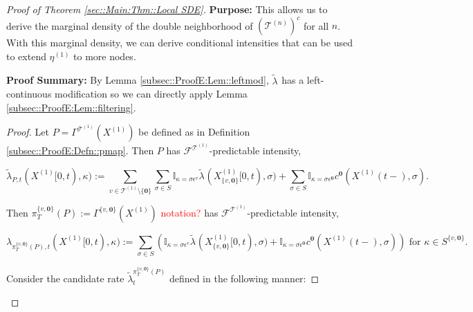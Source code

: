 \documentclass[12pt]{article}
\newcommand{\mb}{\mathbb}
\newcommand{\mc}{\mathcal}
\newcommand{\te}{\text}
\newcommand{\ep}{\epsilon}
\newcommand{\tr}{\textcolor{red}}
\newcommand{\purpose}{\textbf{Purpose: }}
\newcommand{\pfsum}{\textbf{Proof Summary: }}
\newcommand{\defeq}{:=}								%
\renewcommand{\root}{\mathbf{0}}				%
\renewcommand{\v}{v}							%
\renewcommand{\S}{S}							%
\newcommand{\s}{\sigma}							%
\newcommand{\ev}{\ep}							%
\newcommand{\T}{T}								%
\renewcommand{\t}{t}							%
\newcommand{\proj}{\pi}							%
\newcommand{\F}{\mc{F}}							%
\newcommand{\X}{X}								%
\newcommand{\IGr}{c}							%
\newcommand{\vind}[1]{^{#1}}					%
\newcommand{\carp}[1]{^{#1}}					%
\newcommand{\vsi}[1]{^{#1}}						%
\newcommand{\cind}[1]{_{#1}}					%
\newcommand{\tp}[1]{(#1)}						%
\newcommand{\tip}[1]{#1}						%
\newcommand{\ts}[1]{_{#1}}						%
\newcommand{\tree}{\mc{T}}						%
\newcommand{\sln}[1]{^{(#1)}}					%
\newcommand{\rate}{\lambda}						%
\newcommand{\alt}[1]{\widetilde{#1}}			%
\newcommand{\pra}[1]{_{#1}}						%
\newcommand{\mmm}{\eta}							%
\newcommand{\pmap}{\Gamma}						%
\renewcommand{\mark}{\kappa}					%
\newcommand{\rp}{P}								%
\newcommand{\crate}{\alt{\lambda}}				%
\newcommand{\prats}[2]{_{#1,#2}}				%
\begin{document}
\begin{proof}[Proof of Theorem \ref{sec::Main:Thm::Local SDE}]
\purpose This allows us to derive the marginal density of the double neighborhood of \((\tree\sln{n})^c\) for all \(n\). With this marginal density, we can derive conditional intensities that can be used to extend \(\mmm\sln{1}\ts{}\) to more nodes.

\pfsum By Lemma \ref{subsec::ProofE:Lem::leftmod}, \(\crate\vind{}\ts{}\) has a left-continuous modification so we can directly apply Lemma \ref{subsec::ProofE:Lem::filtering}.

\begin{proof}
Let \(\rp = \pmap\vind{\tree\sln{1}}(\X\sln{1}\cind{}\tip{})\) be defined as in Definition \ref{subsec::ProofE:Defn::pmap}. Then \(\rp\) has \(\F\vsi{\tree\sln{1}}\ts{}\)-predictable intensity,

\[\crate\prats{\rp}{\t}(\X\sln{1}\cind{}\tip{[0,\t)},\mark{}) \defeq \sum_{\v\in \tree\sln{1}\setminus\{\root\}}\sum_{\s\in \S} \mb{I}_{\mark{} = \s\ev\vind{\v}}\crate\vind{}\ts{}(\X\sln{1}\cind{\{\v,\root\}}\tip{[0,\t)},\s) + \sum_{\s\in\S}\mb{I}_{\mark{} = \s\ev\vind{\root}}\IGr\vind{\root}(\X\sln{1}\cind{}\tp{\t-},\s).\]

Then \(\proj\vsi{\{\v,\root\}}\ts{\T}(\rp)\defeq \pmap\vind{\{\v,\root\}}(\X\sln{1}\cind{}\tip{})\) \tr{notation?} has \(\F\vsi{\tree\sln{1}}\ts{}\)-predictable intensity,

\[\rate\prats{\proj\vsi{\{\v,\root\}}\ts{\T}(\rp)}{\t}(\X\sln{1}\cind{}\tip{[0,\t)},\mark{}) \defeq \sum_{\s\in \S} \left(\mb{I}_{\mark{} = \s\ev\vind{\v}}\crate\vind{}\ts{}(\X\sln{1}\cind{\{\v,\root\}}\tip{[0,\t)},\s) + \mb{I}_{\mark{} = \s\ev\vind{\root}}\IGr\vind{\root}(\X\sln{1}\cind{}\tp{\t-},\s)\right)\te{ for } \kappa \in \S\carp{\{\v,\root\}}.\]

Consider the candidate rate \(\crate\vind{\proj\vsi{\{\v,\root\}}\ts{\T}(\rp)}\ts{\t}\) defined in the following manner:


\end{proof}
\end{proof}
\end{document}
